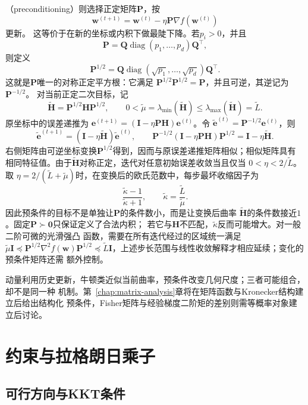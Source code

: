 （preconditioning）则选择正定矩阵$\bm{P}$，按
\[
  \bm{w}^{(t+1)}
  =
  \bm{w}^{(t)}-\eta\bm{P}\nabla f(\bm{w}^{(t)})
\]
更新。
这等价于在新的坐标或内积下做最陡下降。若\(p_i>0\)，并且
\[
  \bm{P}
  =
  \bm{Q}\operatorname{diag}(p_1,\ldots,p_d)\bm{Q}^{\top},
\]
则定义
\[
  \bm{P}^{1/2}
  =
  \bm{Q}\operatorname{diag}(\sqrt{p_1},\ldots,\sqrt{p_d})\bm{Q}^{\top}.
\]
这就是$\bm{P}$唯一的对称正定平方根：它满足
$\bm{P}^{1/2}\bm{P}^{1/2}=\bm{P}$，并且可逆，其逆记为$\bm{P}^{-1/2}$。
对当前正定二次目标，记
\[
  \widetilde{\bm{H}}=\bm{P}^{1/2}\bm{H}\bm{P}^{1/2},
  \qquad
  0<\widetilde{\mu}
  =\lambda_{\min}(\widetilde{\bm{H}})
  \leq\lambda_{\max}(\widetilde{\bm{H}})
  =\widetilde{L}.
\]
原坐标中的误差递推为
$\bm{e}^{(t+1)}=(\bm{I}-\eta\bm{P}\bm{H})\bm{e}^{(t)}$。令
$\widetilde{\bm{e}}^{(t)}=\bm{P}^{-1/2}\bm{e}^{(t)}$，则
\[
  \widetilde{\bm{e}}^{(t+1)}
  =
  (\bm{I}-\eta\widetilde{\bm{H}})
  \widetilde{\bm{e}}^{(t)},
  \qquad
  \bm{P}^{-1/2}
  (\bm{I}-\eta\bm{P}\bm{H})
  \bm{P}^{1/2}
  =
  \bm{I}-\eta\widetilde{\bm{H}}.
\]
右侧矩阵由可逆坐标变换$\bm{P}^{1/2}$得到，因而与原误差递推矩阵相似；相似矩阵具有
相同特征值。由于$\widetilde{\bm{H}}$对称正定，迭代对任意初始误差收敛当且仅当
$0<\eta<2/\widetilde{L}$。取
$\eta=2/(\widetilde{L}+\widetilde{\mu})$时，在变换后的欧氏范数中，每步最坏收缩因子为
\[
  \frac{\widetilde{\kappa}-1}{\widetilde{\kappa}+1},
  \qquad
  \widetilde{\kappa}
  =\frac{\widetilde{L}}{\widetilde{\mu}}.
\]
因此预条件的目标不是单独让$\bm{P}$的条件数小，而是让变换后曲率
$\widetilde{\bm{H}}$的条件数接近$1$。固定$\bm{P}\succ\bm{0}$只保证定义了合法内积；
若它与$\bm{H}$不匹配，$\widetilde{\kappa}$反而可能增大。对一般二阶可微的光滑强凸
函数，需要在所有迭代经过的区域统一满足
$\widetilde{\mu}\bm{I}\preceq
\bm{P}^{1/2}\nabla^2f(\bm{w})\bm{P}^{1/2}
\preceq\widetilde{L}\bm{I}$，上述步长范围与线性收敛解释才相应延续；变化的预条件矩阵还需
额外控制。

动量利用历史更新，牛顿类近似当前曲率，预条件改变几何尺度；三者可能组合，却不是同一种
机制。第~\ref{chap:matrix-analysis}章将在矩阵函数与Kronecker结构建立后给出结构化
预条件，Fisher矩阵与经验梯度二阶矩的差别则需等概率对象建立后讨论。

\section{约束与拉格朗日乘子}
\label{sec:opt-kkt}

\subsection{可行方向与KKT条件}

